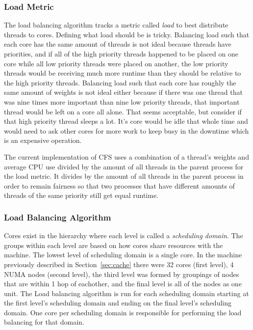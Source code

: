 \documentclass{sig-alternate}
\begin{document}
\subsubsection{Load Metric}
\label{sec:loadmetric}

The load balancing algorithm tracks a metric called \emph{load} to best distribute threads to cores. Defining what load should be is tricky. Balancing load such that each core has the same amount of threads is not ideal because threads have priorities, and if all of the high priority threads happened to be placed on one core while all low priority threads were placed on another, the low priority threads would be receiving much more runtime than they should be relative to the high priority threads. Balancing load such that each core has roughly the same amount of weights is not ideal either because if there was one thread that was nine times more important than nine low priority threads, that important thread would be left on a core all alone. That seems acceptable, but consider if that high priority thread sleeps a lot. It's core would be idle that whole time and would need to ask other cores for more work to keep busy in the downtime which is an expensive operation.~\cite{Lozi:2016}

The current implementation of CFS uses a combination of a thread's weights and average CPU use divided by the amount of all threads in the parent process for the load metric. It divides by the amount of all threads in the parent process in order to remain fairness so that two processes that have different amounts of threads of the same priority still get equal runtime.~\cite{Lozi:2016}

\subsubsection{Load Balancing Algorithm}
\label{sec:loadbalancealg}

Cores exist in the hierarchy where each level is called a \emph{scheduling domain}. The groups within each level are based on how cores share resources with the machine. The lowest level of scheduling domain is a single core. In the machine previously described in Section~\ref{sec:cache} there were 32 cores (first level), 4 NUMA nodes (second level), the third level was formed by groupings of nodes that are within 1 hop of eachother, and the final level is all of the nodes as one unit.
The Load balancing algorithm is run for each scheduling domain starting at the first level's scheduling domain and ending on the final level's scheduling domain. One core per scheduling domain is responsible for performing the load balancing for that domain.
\end{document}
